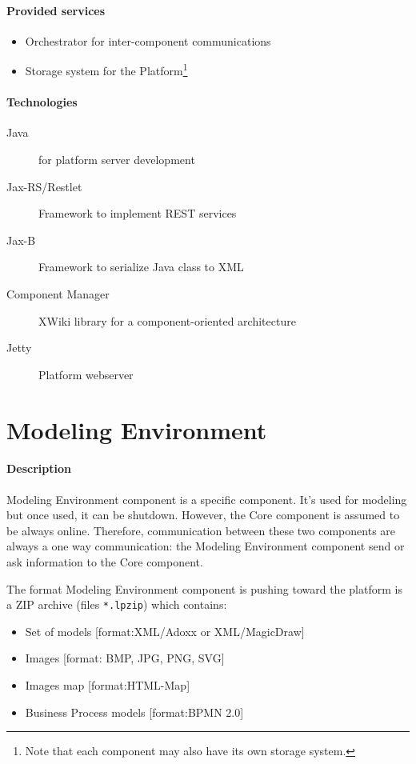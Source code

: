 \documentclass{learnpad}
\begin{document}
\paragraph{Provided services}
\begin{itemize}
	\item Orchestrator for inter-component communications
	\item Storage system for the \learnpad Platform\footnote{Note that each component may also have its own storage system.}
\end{itemize}

\paragraph{Technologies}
\begin{description}
	\item[Java] for platform server development
	\item[Jax-RS/Restlet] Framework to implement REST services
	\item[Jax-B] Framework to serialize Java class to XML
	\item[Component Manager] XWiki library for a component-oriented architecture
	\item[Jetty] Platform webserver
\end{description}

\section{Modeling Environment}\label{sec:modeling-environment}
\paragraph{Description}
Modeling Environment component is a specific component.  It's used for modeling
but once used, it can be shutdown.  However, the \learnpad Core component is
assumed to be always online.  Therefore, communication between these two
components are always a one way communication: the Modeling Environment
component send or ask information to the \learnpad Core component.

The format Modeling Environment component is pushing toward the \learnpad
platform is a ZIP archive (files \verb+*.lpzip+) which contains:
\begin{itemize}
	\item Set of models [format:XML/Adoxx or XML/MagicDraw]
	\item Images [format: BMP, JPG, PNG, SVG]
	\item Images map [format:HTML-Map]
	\item Business Process models [format:BPMN 2.0]
\end{itemize}
\end{document}
